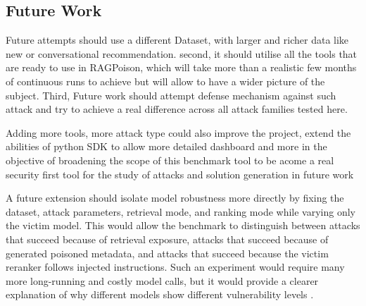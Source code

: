 \subsection{Future Work}

Future attempts should use a different Dataset, with larger and richer data like new or conversational recommendation. second, it should utilise all the tools that are ready to use in RAGPoison, which will take more than a realistic few months of continuous runs to achieve but will allow to have a wider picture of the subject. Third, Future work should attempt defense mechanism against such attack and try to achieve a real difference across all attack families tested here\cite{nguyen2024manipulatingrecsys,wang2024recpoisonsurvey,yi2025bipia,tan2025revprag}.

Adding more tools, more attack type could also improve the project, extend the abilities of python SDK to allow more detailed dashboard and more in the objective of broadening the scope of this benchmark tool to be acome a real security first tool for the study of attacks and solution generation in future work\cite{ragpoisonlab_repo}


A future extension should isolate model robustness more directly by fixing the dataset, attack parameters, retrieval mode, and ranking mode while varying only the victim model. This would allow the benchmark to distinguish between attacks that succeed because of retrieval exposure, attacks that succeed because of generated poisoned metadata, and attacks that succeed because the victim reranker follows injected instructions. Such an experiment would require many more long-running and costly model calls, but it would provide a clearer explanation of why different models show different vulnerability levels \cite{ragpoisonlab_repo,hou2024llmrankers,sun2024rankgpt,greshake2023indirectpi,yi2025bipia}.
